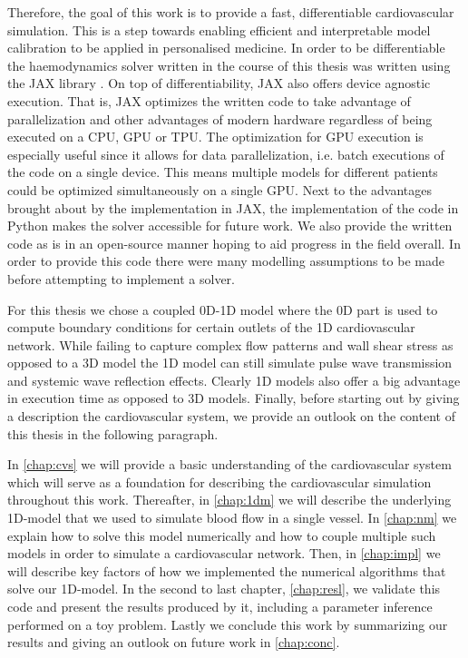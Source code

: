 \documentclass[a4paper, oneside]{discothesis}
\begin{document}
Therefore, the goal of this work is to provide a fast, differentiable cardiovascular simulation.
This is a step towards enabling efficient and interpretable model calibration to be applied in personalised medicine.
In order to be differentiable the haemodynamics solver written in the course of this thesis was written using the JAX library \cite{jax123}.
On top of differentiability, JAX also offers device agnostic execution.
That is, JAX optimizes the written code to take advantage of parallelization and other advantages of modern hardware regardless of being executed on a CPU, GPU or TPU.
The optimization for GPU execution is especially useful since it allows for data parallelization, i.e. batch executions of the code on a single device.
This means multiple models for different patients could be optimized simultaneously on a single GPU.
Next to the advantages brought about by the implementation in JAX, the implementation of the code in Python makes the solver accessible for future work.
We also provide the written code as is in an open-source manner hoping to aid progress in the field overall. 
In order to provide this code there were many modelling assumptions to be made before attempting to implement a solver.

For this thesis we chose a coupled 0D-1D model where the 0D part is used to compute boundary conditions for certain outlets of the 1D cardiovascular network.
While failing to capture complex flow patterns and wall shear stress as opposed to a 3D model the 1D model can still simulate pulse wave transmission and systemic wave reflection effects.
Clearly 1D models also offer a big advantage in execution time as opposed to 3D models. \cite{shi2011review,pfaller2020using,arzani2022machine} 
Finally, before starting out by giving a description the cardiovascular system, we provide an outlook on the content of this thesis in the following paragraph.

In \autoref{chap:cvs} we will provide a basic understanding of the cardiovascular system which will serve as a foundation for describing the cardiovascular simulation throughout this work.
Thereafter, in \autoref{chap:1dm} we will describe the underlying 1D-model that we used to simulate blood flow in a single vessel.
In \autoref{chap:nm} we explain how to solve this model numerically and how to couple multiple such models in order to simulate a cardiovascular network.
Then, in \autoref{chap:impl}  we will describe key factors of how we implemented the numerical algorithms that solve our 1D-model.
In the second to last chapter, \autoref{chap:resl}, we validate this code and present the results produced by it, including a parameter inference performed on a toy problem.
Lastly we conclude this work by summarizing our results and giving an outlook on future work in \autoref{chap:conc}.
\end{document}
